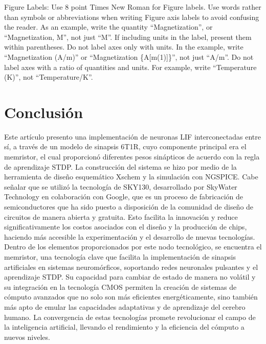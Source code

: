 \documentclass[conference]{IEEEtran}
\begin{document}
Figure Labels: Use 8 point Times New Roman for Figure labels. Use words 
rather than symbols or abbreviations when writing Figure axis labels to 
avoid confusing the reader. As an example, write the quantity 
``Magnetization'', or ``Magnetization, M'', not just ``M''. If including 
units in the label, present them within parentheses. Do not label axes only 
with units. In the example, write ``Magnetization (A/m)'' or ``Magnetization 
\{A[m(1)]\}'', not just ``A/m''. Do not label axes with a ratio of 
quantities and units. For example, write ``Temperature (K)'', not 
``Temperature/K''.

\section*{Conclusión}

Este artículo presento una implementación de neuronas LIF interconectadas entre sí, a través de un modelo de sinapsis 6T1R, cuyo componente principal era el memristor, el cual proporcionó diferentes pesos sinápticos de acuerdo con la regla de aprendizaje STDP. La construcción del sistema se hizo por medio de la herramienta de diseño esquemático Xschem y la simulación con NGSPICE. Cabe señalar que se utilizó la tecnología de SKY130, desarrollado por SkyWater Technology en colaboración con Google, que es un proceso de fabricación de semiconductores que ha sido puesto a disposición de la comunidad de diseño de circuitos de manera abierta y gratuita. Esto facilita la innovación y reduce significativamente los costos asociados con el diseño y la producción de chips, haciendo más accesible la experimentación y el desarrollo de nuevas tecnologías. Dentro de los elementos proporcionados por este nodo tecnológico, se encuentra el memristor, una tecnología clave que facilita la implementación de sinapsis artificiales en sistemas neuromórficos, soportando redes neuronales pulsantes y el aprendizaje STDP. Su capacidad para cambiar de estado de manera no volátil y su integración en la tecnología CMOS permiten la creación de sistemas de cómputo avanzados que no solo son más eficientes energéticamente, sino también más apto de emular las capacidades adaptativas y de aprendizaje del cerebro humano. La convergencia de estas tecnologías promete revolucionar el campo de la inteligencia artificial, llevando el rendimiento y la eficiencia del cómputo a nuevos niveles.



\end{document}
